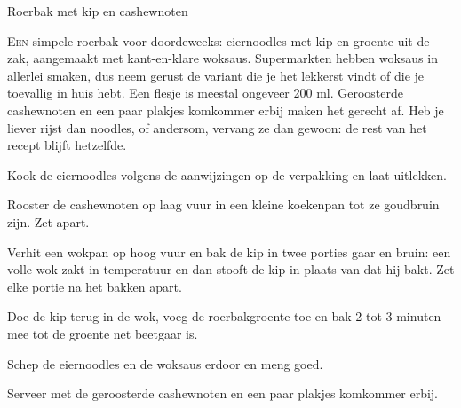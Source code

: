 \begin{recipe}{Roerbak met kip en cashewnoten}


\lettrine{E}{en} simpele roerbak voor doordeweeks: eiernoodles met kip en
groente uit de zak, aangemaakt met kant-en-klare woksaus. Supermarkten
hebben woksaus in allerlei smaken, dus neem gerust de variant die je het
lekkerst vindt of die je toevallig in huis hebt. Een flesje is meestal
ongeveer 200 ml. Geroosterde cashewnoten en een paar plakjes komkommer
erbij maken het gerecht af. Heb je liever rijst dan noodles, of andersom,
vervang ze dan gewoon: de rest van het recept blijft hetzelfde.

\begin{ingredients}
\end{ingredients}

\begin{steps}
  \item Kook de eiernoodles volgens de aanwijzingen op de verpakking en laat uitlekken.
  \item Rooster de cashewnoten op laag vuur in een kleine koekenpan tot ze goudbruin
        zijn. Zet apart.
  \item Verhit een wokpan op hoog vuur en bak de kip in twee porties gaar en bruin: een
        volle wok zakt in temperatuur en dan stooft de kip in plaats van dat
        hij bakt. Zet elke portie na het bakken apart.
  \item Doe de kip terug in de wok, voeg de roerbakgroente toe en bak 2 tot 3
        minuten mee tot de groente net beetgaar is.
  \item Schep de eiernoodles en de woksaus erdoor en meng goed.
  \item Serveer met de geroosterde cashewnoten en een paar plakjes komkommer erbij.
\end{steps}
\end{recipe}
